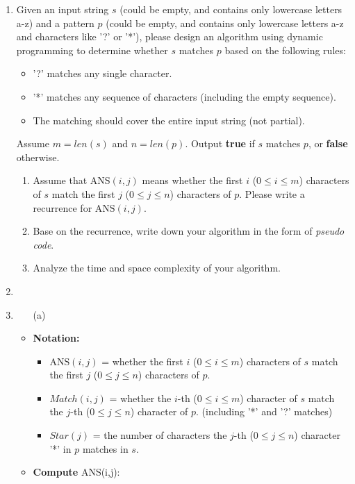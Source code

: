 \documentclass[12pt,a4paper]{article}
\makeatletter
\newtheorem*{solution}{Solution}
\theoremstyle{definition}
\renewenvironment{solution}[1][Solution] {\par\pushQED{\qed}\normalfont\topsep6\p@\@plus6\p@\relax\trivlist\item[\hskip\labelsep\bfseries#1\@addpunct{.}]\ignorespaces}{\popQED\endtrivlist\@endpefalse} \makeatother
\makeatother
\begin{document}
\begin{enumerate}
    \item
    Given an input string $s$ (could be empty, and contains only lowercase letters a-z) and a pattern $p$ (could be empty, and contains only lowercase letters a-z and characters like '?' or '*'), please design an algorithm using dynamic programming to determine whether $s$ matches $p$ based on the following rules:
    \begin{itemize}
        \item
        '?' matches any single character.
        \item
        '*' matches any sequence of characters (including the empty sequence).
        \item
        The matching should cover the entire input string (not partial).
    \end{itemize}
    Assume $m=len(s)$ and $n=len(p)$. Output \textbf{true} if $s$ matches $p$, or \textbf{false} otherwise.
    \begin{enumerate}
        \item
        Assume that $\text{ANS}(i, j)$ means whether the first $i$ ($0 \leq i \leq m$) characters of $s$ match the first $j$ ($0 \leq j \leq n$) characters of $p$. Please write a recurrence for $\text{ANS}(i, j)$.

        \item
        Base on the recurrence, write down your algorithm in the form of \emph{pseudo code}.

        \item
        Analyze the time and space complexity of your algorithm.
    \end{enumerate}

    \begin{solution}\item
    \renewcommand{\qedsymbol}{}
    \begin{itemize}
    \item [(a)]
    \item 
    \textbf{Notation:}\par
        \begin{itemize}
            \item $\text{ANS}(i,j)$ = whether the first $i$ ($0 \leq i \leq m$) characters of $s$ match the first $j$ ($0 \leq j \leq n$) characters of $p$.
            \item $Match(i,j)$ = whether the $i$-th ($0 \leq i \leq m$) character of $s$ match the $j$-th ($0 \leq j \leq n$) character of $p$. (including '*' and '?' matches)
            \item $Star(j)$ = the number of characters the $j$-th ($0 \leq j \leq n$) character '*' in $p$ matches in $s$.
        \end{itemize}\par
    \item  \textbf{Compute }ANS(i,j):\item []


\end{itemize}
\end{solution}
\end{enumerate}
\end{document}
